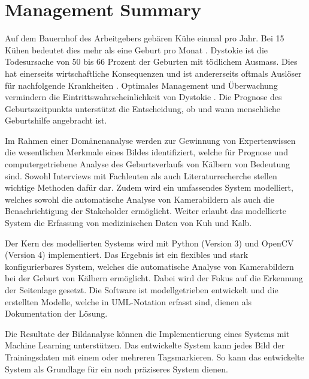 

\chapter{Management Summary}

Auf dem Bauernhof des Arbeitgebers gebären Kühe einmal pro Jahr. Bei 15 Kühen bedeutet dies mehr als eine Geburt pro Monat \citep{Muller2019}. Dystokie ist die Todesursache von 50 bis 66 Prozent der Geburten mit tödlichem Ausmass. Dies hat einerseits wirtschaftliche Konsequenzen \citep[S. 1]{Saint-Dizier2015} und ist andererseits oftmals Auslöser für nachfolgende Krankheiten \citep[S. 1]{Lange2017}.  Optimales Management und Überwachung vermindern die Eintrittswahrscheinlichkeit von Dystokie \citep[S. 1]{Lange2017}. Die Prognose des Geburtszeitpunkts unterstützt die Entscheidung, ob und wann menschliche Geburtshilfe angebracht ist. \citep[S. 1]{Saint-Dizier2015}

Im Rahmen einer Domänenanalyse werden zur Gewinnung von Expertenwissen die wesentlichen Merkmale eines Bildes  identifiziert, welche für Prognose und computergetriebene Analyse des Geburtsverlaufs von Kälbern von Bedeutung sind.
Sowohl Interviews mit Fachleuten als auch Literaturrecherche stellen wichtige Methoden dafür dar. Zudem wird ein umfassendes System modelliert, welches sowohl die automatische Analyse von Kamerabildern als auch die Benachrichtigung der Stakeholder ermöglicht. Weiter erlaubt das modellierte System die Erfassung von medizinischen Daten von Kuh und Kalb.

Der Kern des modellierten Systems wird mit Python (Version 3) und OpenCV (Version 4) implementiert. Das Ergebnis ist ein flexibles und stark konfigurierbares System, welches die automatische Analyse von Kamerabildern bei der Geburt von Kälbern ermöglicht. Dabei wird der Fokus auf die Erkennung der Seitenlage gesetzt. Die Software ist modellgetrieben entwickelt und die erstellten Modelle, welche in UML-Notation erfasst sind, dienen als Dokumentation der Lösung.

Die Resultate der Bildanalyse können die Implementierung eines Systems mit Machine Learning unterstützen. Das entwickelte System kann jedes Bild der Trainingsdaten mit einem oder mehreren \flqq Tags\frqq markieren. So kann das entwickelte System als Grundlage für ein noch präziseres System dienen.